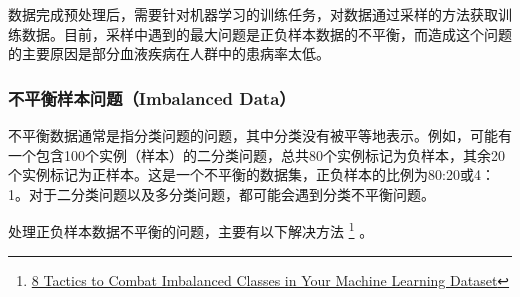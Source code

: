 \documentclass[UTF8,a4paper,12pt, onecolumn]{ctexart}
\begin{document}
数据完成预处理后，需要针对机器学习的训练任务，对数据通过采样的方法获取训练数据。目前，采样中遇到的最大问题是正负样本数据的不平衡，而造成这个问题的主要原因是部分血液疾病在人群中的患病率太低。

\subsubsection{不平衡样本问题（Imbalanced Data）}

不平衡数据通常是指分类问题的问题，其中分类没有被平等地表示。例如，可能有一个包含100个实例（样本）的二分类问题，总共80个实例标记为负样本，其余20个实例标记为正样本。这是一个不平衡的数据集，正负样本的比例为80:20或4：1。对于二分类问题以及多分类问题，都可能会遇到分类不平衡问题。

处理正负样本数据不平衡的问题，主要有以下解决方法 \footnote{\href{https://machinelearningmastery.com/tactics-to-combat-imbalanced-classes-in-your-machine-learning-dataset/}{8 Tactics to Combat Imbalanced Classes in Your Machine Learning Dataset}} 。
\end{document}
